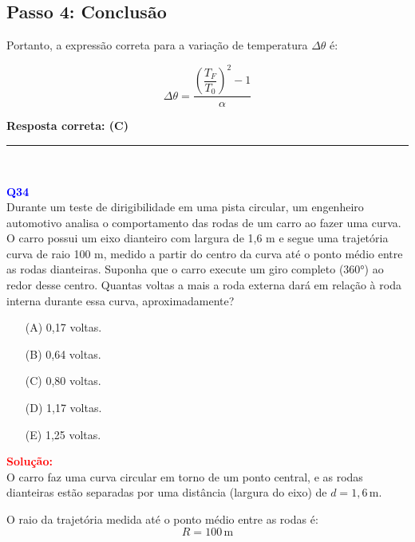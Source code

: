 \documentclass[a4paper,12pt]{article}
\begin{document}
\begin{flushleft}
\subsection*{Passo 4: Conclusão}

Portanto, a expressão correta para a variação de temperatura $\Delta \theta$ é:

\[
\Delta \theta = \frac{\left(\dfrac{T_F}{T_0}\right)^2 - 1}{\alpha}
\]

\bigskip


\textbf{Resposta correta: \colorbox{green!50}{(C)}}

\end{flushleft}
\noindent\rule{\linewidth}{0.6pt}\\

\begin{flushleft}
\textbf{\textcolor{blue}{\Large Q34}}\\

Durante um teste de dirigibilidade em uma pista circular, um engenheiro automotivo analisa o comportamento das 
rodas de um carro ao fazer uma curva. O carro possui um eixo dianteiro com largura de 1,6 m e segue uma trajetória 
curva de raio 100 m, medido a partir do centro da curva até o ponto médio entre as rodas dianteiras. Suponha que o 
carro execute um giro completo (360°) ao redor desse centro. Quantas voltas a mais a roda externa dará em relação à 
roda interna durante essa curva, aproximadamente?

\begin{itemize}
\item[(A)] 0,17 voltas.
\item[(B)] 0,64 voltas.
\item[(C)] 0,80 voltas.
\item[(D)] 1,17 voltas.
\item[(E)] 1,25 voltas.

\end{itemize}

\vspace{0.5cm}

\textcolor{red}{\textbf{Solução:}}\\

O carro faz uma curva circular em torno de um ponto central, e as rodas dianteiras estão separadas por uma distância (largura do eixo) de $d = 1,6\,\text{m}$.

O raio da trajetória medida até o ponto médio entre as rodas é:
\[
R = 100\,\text{m}
\]

\bigskip


\end{flushleft}
\end{document}
